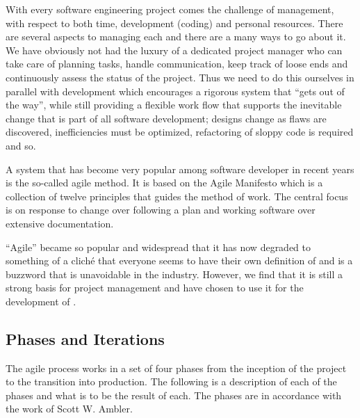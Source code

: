 
With every software engineering project comes the challenge of management, with
respect to both time, development (coding) and personal resources. There are
several aspects to managing each and there are a many ways to go about it. We
have obviously not had the luxury of a dedicated project manager who can take
care of planning tasks, handle communication, keep track of loose ends and
continuously assess the status of the project. Thus we need to do this ourselves
in parallel with development which encourages a rigorous system that ``gets out
of the way'', while still providing a flexible work flow that supports the
inevitable change that is part of all software development; designs change as
flaws are discovered, inefficiencies must be optimized, refactoring of sloppy
code is required and so.

A system that has become very popular among software developer in recent years
is the so-called agile method. It is based on the Agile
Manifesto\cite{agile-manifesto} which is a collection of twelve principles that
guides the method of work. The central focus is on response to change over
following a plan and working software over extensive documentation.

``Agile'' became so popular and widespread that it has now degraded to something
of a clich\'e that everyone seems to have their own definition of and is a
buzzword that is unavoidable in the industry. However, we find that it is still
a strong basis for project management and have chosen to use it for the
development of \thename{}.

\subsection{Phases and Iterations}

The agile process works in a set of four phases from the inception of the
project to the transition into production. The following is a description of
each of the phases and what is to be the result of each. The phases are in
accordance with the work of Scott W. Ambler\cite{aup}.

